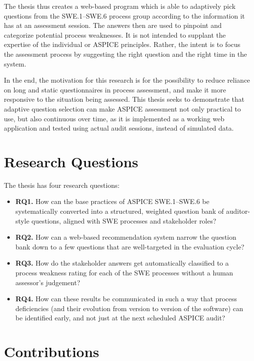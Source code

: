 \documentclass[a4paper, 12pt, oneside, openany, BCOR1cm,toc=chapterentrywithdots]{scrbook}
\begin{document}
The thesis thus creates a web-based program which is able to adaptively pick questions from the
SWE.1--SWE.6 process group according to the information it has at an assessment session. The
answers then are used to pinpoint and categorize potential process weaknesses. It is not intended
to supplant the expertise of the individual or ASPICE principles. Rather, the intent is to focus
the assessment process by suggesting the right question and the right time in the system.

In the end, the motivation for this research is for the possibility to reduce reliance on long and
static questionnaires in process assessment, and make it more responsive to the situation being
assessed. This thesis seeks to demonstrate that adaptive question selection can make ASPICE
assessment not only practical to use, but also continuous over time, as it is implemented as a
working web application and tested using actual audit sessions, instead of simulated data.

\section{Research Questions}

The thesis has four research questions:

\begin{itemize}
  \item \textbf{RQ1.} How can the base practices of ASPICE SWE.1--SWE.6 be systematically
  converted into a structured, weighted question bank of auditor-style questions, aligned with
  SWE processes and stakeholder roles?
  \item \textbf{RQ2.} How can a web-based recommendation system narrow the question bank down
  to a few questions that are well-targeted in the evaluation cycle?
  \item \textbf{RQ3.} How do the stakeholder answers get automatically classified to a process
  weakness rating for each of the SWE processes without a human assessor's judgement?
  \item \textbf{RQ4.} How can these results be communicated in such a way that process
  deficiencies (and their evolution from version to version of the software) can be identified
  early, and not just at the next scheduled ASPICE audit?
\end{itemize}

\section{Contributions}
\end{document}
